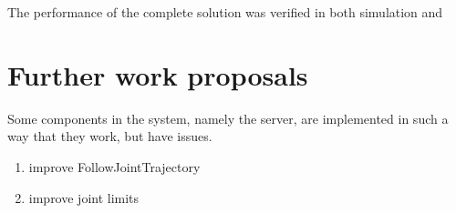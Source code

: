 \documentclass[buriama8_dp.tex]{subfiles}
\begin{document}
The performance of the complete solution was verified in both simulation and 

\section{Further work proposals}
\label{sec:label}

Some components in the system, namely the  server, are implemented in such a way that they work, but have issues.

\begin{enumerate}
\item improve FollowJointTrajectory
\item improve joint limits
\end{enumerate}
\end{document}
